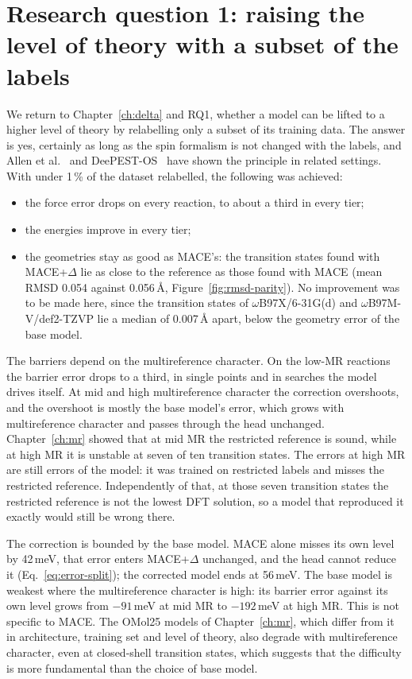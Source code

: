 \section{Research question 1: raising the level of theory with a subset of the labels}

We return to Chapter~\ref{ch:delta} and RQ1, whether a model can be
lifted to a higher level of theory by relabelling only a subset of its
training data. The answer is yes, certainly as long as the spin
formalism is not changed with the labels, and Allen et
al.~\cite{allen2026} and DeePEST-OS~\cite{ren2026} have shown the
principle in related settings. With under 1\,\% of the dataset relabelled, the following
was achieved:

\begin{itemize}
  \item the force error drops on every reaction, to about a third in
    every tier;
  \item the energies improve in every tier;
  \item the geometries stay as good as MACE's: the transition states
    found with MACE+$\Delta$ lie as close to the reference as those
    found with MACE (mean RMSD 0.054 against 0.056\,\AA,
    Figure~\ref{fig:rmsd-parity}). No improvement was to be made
    here, since the transition states of
    \mbox{$\omega$B97X/6-31G(d)} and \mbox{$\omega$B97M-V/def2-TZVP}
    lie a median of 0.007\,\AA{} apart, below the geometry error
    of the base model.
\end{itemize}

The barriers depend on the multireference character. On the low-MR
reactions the barrier error drops to a third, in single points and in
searches the model drives itself. At mid and high multireference
character the correction overshoots, and the overshoot is mostly the
base model's error, which grows with multireference character and
passes through the head unchanged. Chapter~\ref{ch:mr} showed that
at mid MR the restricted reference is sound, while at high MR it is
unstable at seven of ten transition states. The errors at high MR are
still errors of the model: it was trained on restricted labels and
misses the restricted reference. Independently of that, at those seven
transition states the restricted reference is not the lowest DFT
solution, so a model that reproduced it exactly would still be wrong
there.

The correction is bounded by the base model. MACE alone misses its
own level by 42\,meV, that error enters MACE+$\Delta$ unchanged, and
the head cannot reduce it (Eq.~\eqref{eq:error-split}); the corrected
model ends at 56\,meV. The base model is weakest where the
multireference character is high: its barrier error against its own
level grows from $-91$\,meV at mid MR to $-192$\,meV at high MR. This
is not specific to MACE. The OMol25 models of Chapter~\ref{ch:mr},
which differ from it in architecture, training set and level of
theory, also degrade with multireference character, even at
closed-shell transition states, which suggests that the difficulty is
more fundamental than the choice of base model.

